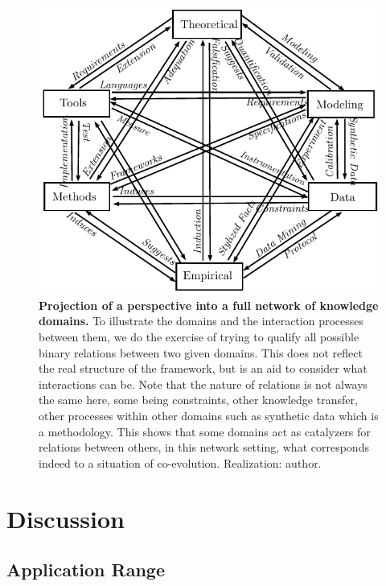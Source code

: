 \documentclass[runningheads,a4paper]{llncs2e/llncs}
\begin{document}
\begin{figure}[h!]
\centering
\includegraphics[width=\textwidth]{figures/framework}
\caption{\textbf{Projection of a perspective into a full network of knowledge domains.} To illustrate the domains and the interaction processes between them, we do the exercise of trying to qualify all possible binary relations between two given domains. This does not reflect the real structure of the framework, but is an aid to consider what interactions can be. Note that the nature of relations is not always the same here, some being constraints, other knowledge transfer, other processes within other domains such as synthetic data which is a methodology. This shows that some domains act as catalyzers for relations between others, in this network setting, what corresponds indeed to a situation of co-evolution. Realization: author.
}
\label{fig:fwk}
\end{figure}




\section{Discussion}



\subsection{Application Range}
\end{document}
